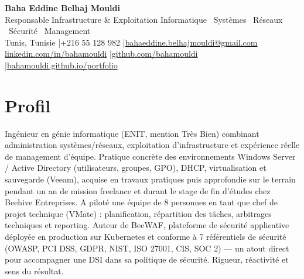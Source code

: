 \documentclass[a4paper,9pt]{article}
\begin{document}
\begin{center}
{\LARGE\bfseries\color{navy} Baha Eddine Belhaj Mouldi}\\[2pt]
{\normalsize\color{navy} Responsable Infrastructure \& Exploitation Informatique \textbar\ Systèmes \textbar\ Réseaux \textbar\ Sécurité \textbar\ Management}\\[3pt]
{\small Tunis, Tunisie \quad|\quad +216 55 128 982 \quad|\quad \href{mailto:bahaeddine.belhajmouldi@gmail.com}{bahaeddine.belhajmouldi@gmail.com}}\\[1pt]
{\small \href{https://www.linkedin.com/in/bahamouldi}{linkedin.com/in/bahamouldi} \quad|\quad \href{https://github.com/bahamouldi}{github.com/bahamouldi} \quad|\quad \href{https://bahamouldi.github.io/portfolio/}{bahamouldi.github.io/portfolio}}
\end{center}
\vspace{1pt}
\section{Profil}
Ingénieur en génie informatique (ENIT, mention Très Bien) combinant administration systèmes/réseaux, exploitation d'infrastructure et expérience réelle de management d'équipe. Pratique concrète des environnements Windows Server / Active Directory (utilisateurs, groupes, GPO), DHCP, virtualisation et sauvegarde (Veeam), acquise en travaux pratiques puis approfondie sur le terrain pendant un an de mission freelance et durant le stage de fin d'études chez Beehive Entreprises. A piloté une équipe de 8 personnes en tant que chef de projet technique (VMate) : planification, répartition des tâches, arbitrages techniques et reporting. Auteur de BeeWAF, plateforme de sécurité applicative déployée en production sur Kubernetes et conforme à 7 référentiels de sécurité (OWASP, PCI DSS, GDPR, NIST, ISO 27001, CIS, SOC 2) --- un atout direct pour accompagner une DSI dans sa politique de sécurité. Rigueur, réactivité et sens du résultat.
\end{document}
